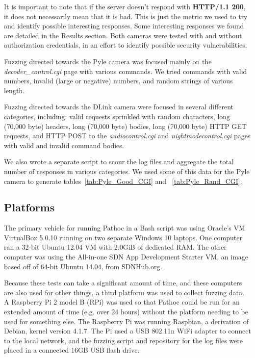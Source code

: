 \documentclass[letterpaper,twocolumn,10pt]{article}
\begin{document}
It is important to note that if the server doesn't respond with \textbf{HTTP/1.1 200}, it does not necessarily mean that it is bad. This is just the metric we used to try and identify possible interesting responses. Some interesting responses we found are detailed in the Results section. Both cameras were tested with and without authorization credentials, in an effort to identify possible security vulnerabilities. 

Fuzzing directed towards the Pyle camera was focused mainly on the \textit{decoder\_control.cgi} page with various commands. We tried commands with valid numbers, invalid (large or negative) numbers, and random strings of various length. 

Fuzzing directed towards the DLink camera were focused in several different categories, including: valid requests sprinkled with random characters, long (70,000 byte) headers, long (70,000 byte) bodies, long (70,000 byte) HTTP GET requests, and HTTP POST to the \textit{audiocontrol.cgi} and \textit{nightmodecontrol.cgi} pages with valid and invalid command bodies. 

We also wrote a separate script to scour the log files and aggregate the total number of responses in various categories. We used some of this data for the Pyle camera to generate tables~\ref{tab:Pyle_Good_CGI} and ~\ref{tab:Pyle_Rand_CGI}. 


\subsection{Platforms}
The primary vehicle for running Pathoc in a Bash script was using Oracle's VM VirtualBox 5.0.10 running on two separate Windows 10 laptops. One computer ran a 32-bit Ubuntu 12.04 VM with 2.0GiB of dedicated RAM. The other computer was using the All-in-one SDN App Development Starter VM, an image based off of 64-bit Ubuntu 14.04, from SDNHub.org.

Because these tests can take a significant amount of time, and these computers are also used for other things, a third platform was used to collect fuzzing data. A Raspberry Pi 2 model B (RPi) was used so that Pathoc could be run for an extended amount of time (e.g. over 24 hours) without the platform needing to be used for something else. The Raspberry Pi was running Raspbian, a derivation of Debian, kernel version 4.1.7. The Pi used a USB 802.11n WiFi adapter to connect to the local network, and the fuzzing script and repository for the log files were placed in a connected 16GB USB flash drive.
\end{document}
